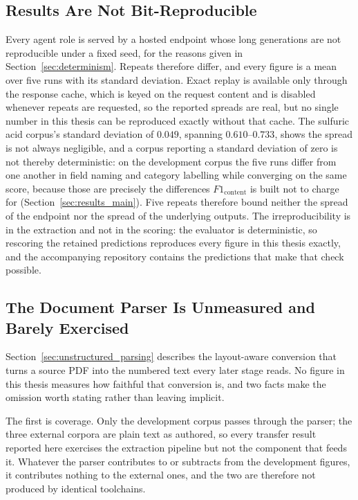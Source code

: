 \documentclass[11pt]{article}
\begin{document}
\subsection{Results Are Not Bit-Reproducible}
\label{sec:lim_repro}
Every agent role is served by a hosted endpoint whose long generations are not
reproducible under a fixed seed, for the reasons given in
Section~\ref{sec:determinism}. Repeats therefore differ, and every figure is a
mean over five runs with its standard deviation. Exact replay is available only
through the response cache, which is keyed on the request content and is disabled
whenever repeats are requested, so the reported spreads are real, but no single
number in this thesis can be reproduced exactly without that cache. The
sulfuric acid corpus's standard deviation of $0.049$, spanning $0.610$--$0.733$,
shows the spread is not always negligible, and a corpus reporting a standard
deviation of zero is not thereby deterministic: on the development corpus the
five runs differ from one another in field naming and category labelling while
converging on the same score, because those are precisely the differences
$F1_{\text{content}}$ is built not to charge for
(Section~\ref{sec:results_main}). Five repeats therefore bound neither the
spread of the endpoint nor the spread of the underlying outputs. The
irreproducibility is in the extraction and not in the scoring: the evaluator is
deterministic, so rescoring the retained predictions reproduces every figure in
this thesis exactly, and the accompanying repository contains the predictions
that make that check possible.

\subsection{The Document Parser Is Unmeasured and Barely Exercised}
\label{sec:lim_parser}
Section~\ref{sec:unstructured_parsing} describes the layout-aware conversion that turns a
source PDF into the numbered text every later stage reads. No figure in this
thesis measures how faithful that conversion is, and two facts make the omission
worth stating rather than leaving implicit.

The first is coverage. Only the development corpus passes through the parser;
the three external corpora are plain text as authored, so every transfer result
reported here exercises the extraction pipeline but not the component that feeds
it. Whatever the parser contributes to or subtracts from the development
figures, it contributes nothing to the external ones, and the two are therefore
not produced by identical toolchains.
\end{document}
